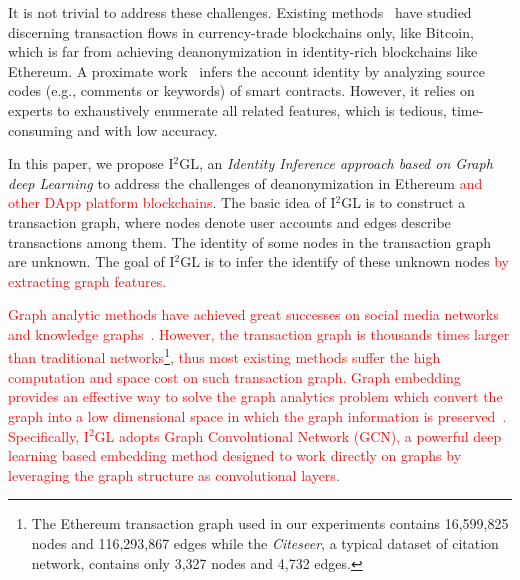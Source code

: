 It is not trivial to address these challenges. Existing methods~\cite{maesa2016analysis,ranshous2017exchange,zhao2015graph} have studied discerning transaction flows in currency-trade blockchains only, like Bitcoin, which is far from achieving deanonymization in identity-rich blockchains like Ethereum. A proximate work~\cite{chen2018infocom} infers the account identity by analyzing source codes (e.g., comments or keywords) of smart contracts. However, it relies on experts to exhaustively enumerate all related features, which is tedious, time-consuming and with low accuracy.


In this paper, we propose I$^2$GL, an \textit{Identity Inference approach based on Graph deep Learning} to address the challenges of deanonymization in Ethereum \textcolor{red}{and other DApp platform blockchains}. The basic idea of I$^2$GL is to construct a transaction graph, where nodes denote user accounts and edges describe transactions among them. The identity of some nodes in the transaction graph are unknown. The goal of I$^2$GL is to infer the identify of these unknown nodes \textcolor{red}{by extracting graph features.} 

\textcolor{red}{Graph analytic methods have achieved great successes on social media networks~\cite{geng2015learning} and knowledge graphs~\cite{bollacker2008freebase}. However, the transaction graph is thousands times larger than traditional networks\footnote{The Ethereum transaction graph used in our experiments contains 16,599,825 nodes and 116,293,867 edges while the \emph{Citeseer}, a typical dataset of citation network, contains only 3,327 nodes and 4,732 edges.}, thus most existing methods suffer the high computation and space cost on such transaction graph. Graph embedding provides an effective way to solve the graph analytics problem which convert the graph into a low dimensional space in which the graph information is preserved~\cite{hamilton2017representation}.
Specifically, I$^2$GL adopts Graph Convolutional Network (GCN), a powerful deep learning based embedding method designed to work directly on graphs by leveraging the graph structure as convolutional layers.}

